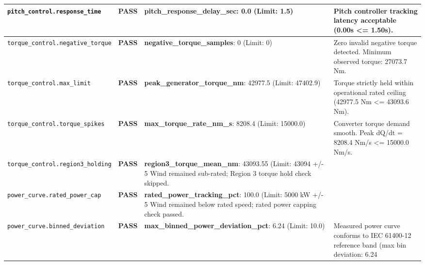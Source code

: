 \documentclass[10pt,a4paper]{article}
\begin{document}
\begin{table}[h!]
\begin{tabularx}{\textwidth}{lcp{3.5cm}X}
    \texttt{pitch_control.response_time} & 
    
        \textcolor{PassGreen}{\textbf{PASS}}
     & 
    \textbf{pitch_response_delay_sec}: 0.0 (Limit: 1.5) & 
    Pitch controller tracking latency acceptable (0.00s <= 1.50s). \\
    \midrule
    
    \texttt{torque_control.negative_torque} & 
    
        \textcolor{PassGreen}{\textbf{PASS}}
     & 
    \textbf{negative_torque_samples}: 0 (Limit: 0) & 
    Zero invalid negative torque detected. Minimum observed torque: 27073.7 Nm. \\
    \midrule
    
    \texttt{torque_control.max_limit} & 
    
        \textcolor{PassGreen}{\textbf{PASS}}
     & 
    \textbf{peak_generator_torque_nm}: 42977.5 (Limit: 47402.9) & 
    Torque strictly held within operational rated ceiling (42977.5 Nm <= 43093.6 Nm). \\
    \midrule
    
    \texttt{torque_control.torque_spikes} & 
    
        \textcolor{PassGreen}{\textbf{PASS}}
     & 
    \textbf{max_torque_rate_nm_s}: 8208.4 (Limit: 15000.0) & 
    Converter torque demand smooth. Peak dQ/dt = 8208.4 Nm/s <= 15000.0 Nm/s. \\
    \midrule
    
    \texttt{torque_control.region3_holding} & 
    
        \textcolor{PassGreen}{\textbf{PASS}}
     & 
    \textbf{region3_torque_mean_nm}: 43093.55 (Limit: 43094 +/- 5%
    Wind remained sub-rated; Region 3 torque hold check skipped. \\
    \midrule
    
    \texttt{power_curve.rated_power_cap} & 
    
        \textcolor{PassGreen}{\textbf{PASS}}
     & 
    \textbf{rated_power_tracking_pct}: 100.0 (Limit: 5000 kW +/- 5%
    Wind remained below rated speed; rated power capping check passed. \\
    \midrule
    
    \texttt{power_curve.binned_deviation} & 
    
        \textcolor{PassGreen}{\textbf{PASS}}
     & 
    \textbf{max_binned_power_deviation_pct}: 6.24 (Limit: 10.0) & 
    Measured power curve conforms to IEC 61400-12 reference band (max bin deviation: 6.24%
    \midrule
    

\end{tabularx}
\end{table}
\end{document}
